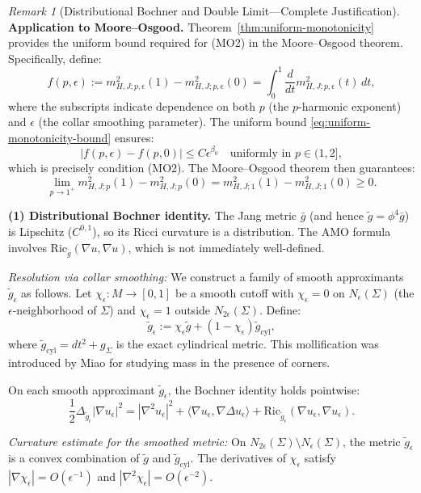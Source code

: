 \documentclass[12pt]{article}
\theoremstyle{plain}
\theoremstyle{definition}
\theoremstyle{remark}
\newtheorem{remark}[theorem]{Remark}
\newcommand{\Ric}{\mathrm{Ric}}
\newcommand{\tg}{\tilde{g}}
\newcommand{\bg}{\bar{g}}
\begin{document}
\begin{remark}[Distributional Bochner and Double Limit---Complete Justification]
\textbf{Application to Moore--Osgood.} Theorem~\ref{thm:uniform-monotonicity} provides the uniform bound required for (MO2) in the Moore--Osgood theorem. Specifically, define:
\[
f(p, \epsilon) := m_{H,J;p,\epsilon}^2(1) - m_{H,J;p,\epsilon}^2(0) = \int_0^1 \frac{d}{dt}m_{H,J;p,\epsilon}^2(t)\, dt,
\]
where the subscripts indicate dependence on both $p$ (the $p$-harmonic exponent) and $\epsilon$ (the collar smoothing parameter). The uniform bound \eqref{eq:uniform-monotonicity-bound} ensures:
\[
|f(p, \epsilon) - f(p, 0)| \leq C\epsilon^{\beta_0} \quad \text{uniformly in } p \in (1, 2],
\]
which is precisely condition (MO2). The Moore--Osgood theorem then guarantees:
\[
\lim_{p \to 1^+} m_{H,J;p}^2(1) - m_{H,J;p}^2(0) = m_{H,J;1}^2(1) - m_{H,J;1}^2(0) \geq 0.
\]

\textbf{(1) Distributional Bochner identity.} The Jang metric $\bg$ (and hence $\tg = \phi^4\bg$) is Lipschitz ($C^{0,1}$), so its Ricci curvature is a distribution. The AMO formula involves $\Ric_{\tg}(\nabla u, \nabla u)$, which is not immediately well-defined. 

\textit{Resolution via collar smoothing:} We construct a family of smooth approximants $\tg_\epsilon$ as follows. Let $\chi_\epsilon: M \to [0,1]$ be a smooth cutoff with $\chi_\epsilon = 0$ on $N_\epsilon(\Sigma)$ (the $\epsilon$-neighborhood of $\Sigma$) and $\chi_\epsilon = 1$ outside $N_{2\epsilon}(\Sigma)$. Define:
\[
\tg_\epsilon := \chi_\epsilon \tg + (1 - \chi_\epsilon) \tg_{\text{cyl}},
\]
where $\tg_{\text{cyl}} = dt^2 + g_\Sigma$ is the exact cylindrical metric. This mollification was introduced by Miao \cite{miao2002} for studying mass in the presence of corners.

On each smooth approximant $\tg_\epsilon$, the Bochner identity holds pointwise:
\[
\frac{1}{2}\Delta_{\tg_\epsilon}|\nabla u_\epsilon|^2 = |\nabla^2 u_\epsilon|^2 + \langle \nabla u_\epsilon, \nabla \Delta u_\epsilon \rangle + \Ric_{\tg_\epsilon}(\nabla u_\epsilon, \nabla u_\epsilon).
\]

\textit{Curvature estimate for the smoothed metric:} On $N_{2\epsilon}(\Sigma) \setminus N_\epsilon(\Sigma)$, the metric $\tg_\epsilon$ is a convex combination of $\tg$ and $\tg_{\text{cyl}}$. The derivatives of $\chi_\epsilon$ satisfy $|\nabla \chi_\epsilon| = O(\epsilon^{-1})$ and $|\nabla^2 \chi_\epsilon| = O(\epsilon^{-2})$. 


\end{remark}
\end{document}
